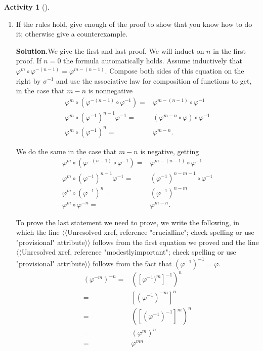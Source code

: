 \documentclass[10pt,]{book}
\theoremstyle{plain}
\theoremstyle{definition}
\newtheorem{activity}[project]{Activity}
\numberwithin{equation}{chapter}
\newcommand{\amp}{&}
\begin{document}
\begin{activity}[]
\begin{enumerate}[label=(\alph*)]
~\par
\item If the rules hold, give enough of the proof to show that you know how to do it; otherwise give a counterexample.%
\par\medskip\noindent%
\textbf{Solution.}\quad We give the first and last proof. We will induct on \(n\) in the first proof. If \(n=0\) the formula automatically holds. Assume inductively that \(\varphi^m\circ\varphi^{-(n-1)} = \varphi^{m-(n-1)}\). Compose both sides of this equation on the right by \(\sigma^{-1}\) and use the associative law for composition of functions to get, in the case that \(m-n\) is nonnegative%
\begin{align*}
\varphi^m\circ(\varphi^{-(n-1)}\circ\varphi^{-1})  =\amp
\varphi^{m-(n-1)}\circ\varphi^{-1}\\
\varphi^m\circ(\varphi^{-1})^{n-1}\varphi^{-1} =\amp
(\varphi^{m-n}\circ\varphi)\circ\varphi^{-1}\\
\varphi^m\circ(\varphi^{-1})^n  =\amp  \varphi^{m-n}.
\end{align*}
%
\par
We do the same in the case that \(m-n\) is negative, getting%
\begin{align*}
\varphi^m\circ(\varphi^{-(n-1)}\circ\varphi^{-1})  =\amp
\varphi^{m-(n-1)}\circ\varphi^{-1}\\
\varphi^m\circ(\varphi^{-1})^{n-1}\varphi^{-1} =\amp
(\varphi^{-1})^{n-m-1}\circ\varphi^{-1}\\
\varphi^m\circ(\varphi^{-1})^n  =\amp  (\varphi^{-1})^{n-m}\\
\varphi^m\circ\varphi^{-n} =\amp \varphi^{m-n}.
\end{align*}
%
\par
To prove the last statement we need to prove, we write the following, in which the line {$\langle\langle$Unresolved xref, reference "crucialline"; check spelling or use "provisional" attribute$\rangle\rangle$} follows from the first equation we proved and the line {$\langle\langle$Unresolved xref, reference "modestlyimportant"; check spelling or use "provisional" attribute$\rangle\rangle$} follows from the fact that \((\varphi^{-1})^{-1} = \varphi\).%
\begin{align*}
(\varphi^{-m})^{-n}  =\amp  ([\varphi^{-1})^m]^{-1})^n\nonumber\\
=\amp [(\varphi^{-1})^{-m}]^n\\
=\amp ([(\varphi^{-1})^{-1}]^m)^n\nonumber\\
=\amp (\varphi^m)^n\\
=\amp \varphi^{mn}\nonumber
\end{align*}
%

\end{enumerate}
\end{activity}
\end{document}
